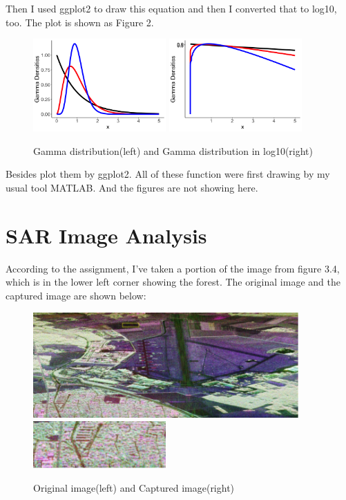 \documentclass{article}
\begin{document}
	\par Then I used ggplot2 to draw this equation and then I converted that to log10, too. The plot is shown as Figure 2.
	\begin{figure}[h] %
		\centering
		\includegraphics[width=2in]{picture/gamma_dis.png} %
		\includegraphics[width=2in]{picture/gamma_log.png}
		\caption{Gamma distribution(left) and Gamma distribution in log10(right)}
	\end{figure}
    
    \par Besides plot them by ggplot2. All of these function were first drawing by my usual tool MATLAB. And the figures are not showing here.
	
	\section*{ SAR Image Analysis} %
	According to the assignment, I've taken a portion of the image from figure 3.4, which is in the lower left corner showing the forest.  The original image and the captured image are shown below: 
	
	\begin{figure}[h] %
		\centering
		\includegraphics[width=4in]{picture/oripic.png} %
		\includegraphics[width=2in]{picture/pic.jpg}
		\caption{Original image(left) and Captured image(right)}
	\end{figure}
	
\end{document}
